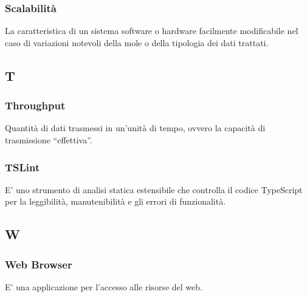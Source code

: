 	\subsubsection*{Scalabilità}
	La caratteristica di un sistema software o hardware facilmente modificabile nel caso di variazioni
	notevoli della mole o della tipologia dei dati trattati.
	
	\subsection*{T}
	\subsubsection*{Throughput}
			Quantità di dati trasmessi in un’unità di tempo, ovvero la capacità di trasmissione “effettiva”.
			
	\subsubsection*{TSLint}
	E' uno strumento di analisi statica estensibile che controlla il codice TypeScript per la leggibilità, manutenibilità e gli errori di funzionalità.
	
	\subsection*{W}
	\subsubsection*{Web Browser}
	E' una applicazione per l'accesso alle risorse del web.

	
	
	